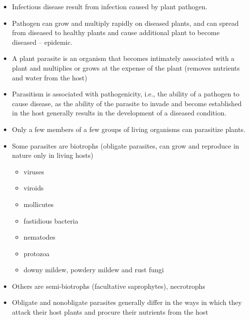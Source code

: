 \documentclass[11pt,dvipsnames,ignorenonframetext,aspectratio=169]{beamer}
\providecommand{\tightlist}{%
  \setlength{\itemsep}{0pt}\setlength{\parskip}{0pt}}
\begin{document}
\begin{frame}{}
\protect\hypertarget{section-6}{}
\begin{itemize}
\tightlist
\item
  Infectious disease result from infection caused by plant pathogen.
\item
  Pathogen can grow and multiply rapidly on diseased plants, and can
  spread from diseased to healthy plants and cause additional plant to
  become diseased -- epidemic.
\item
  A plant parasite is an organism that becomes intimately associated
  with a plant and multiplies or grows at the expense of the plant
  (removes nutrients and water from the host)
\item
  Parasitism is associated with pathogenicity, i.e., the ability of a
  pathogen to cause disease, as the ability of the parasite to invade
  and become established in the host generally results in the
  development of a diseased condition.
\end{itemize}
\end{frame}

\begin{frame}{}
\protect\hypertarget{section-7}{}
\begin{itemize}
\tightlist
\item
  Only a few members of a few groups of living organisms can parasitize
  plants.
\item
  Some parasites are biotrophs (obligate parasites, can grow and
  reproduce in nature only in living hosts)

  \begin{itemize}
  \tightlist
  \item
    viruses
  \item
    viroids
  \item
    mollicutes
  \item
    fastidious bacteria
  \item
    nematodes
  \item
    protozoa
  \item
    downy mildew, powdery mildew and rust fungi
  \end{itemize}
\item
  Others are semi-biotrophs (facultative saprophytes), necrotrophs
\item
  Obligate and nonobligate parasites generally differ in the ways in
  which they attack their host plants and procure their nutrients from
  the host
\end{itemize}
\end{frame}
\end{document}
